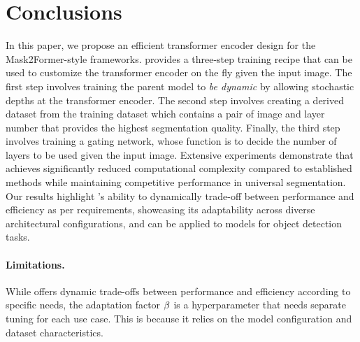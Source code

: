 \section{Conclusions}
In this paper, we propose an efficient transformer encoder design {\ours} for the Mask2Former-style frameworks. \ours provides a three-step training recipe that can be used to customize the transformer encoder on the fly given the input image. The first step involves training the parent model to \textit{be dynamic} by allowing stochastic depths at the transformer encoder. The second step involves creating a derived dataset from the training dataset which contains a pair of image and layer number that provides the highest segmentation quality. Finally, the third step involves training a gating network, whose function is to decide the number of layers to be used given the input image. Extensive experiments demonstrate that {\ours} achieves significantly reduced computational complexity compared to established methods while maintaining competitive performance in universal segmentation. Our results highlight {\ours}'s ability to dynamically trade-off between performance and efficiency as per requirements, showcasing its adaptability across diverse architectural configurations, and can be applied to models for object detection tasks.
%
\paragraph{Limitations.} While {\ours} offers dynamic trade-offs between performance and efficiency according to specific needs, the adaptation factor $\beta$ is a  hyperparameter that needs separate tuning for each use case. This is because it relies on the model configuration and dataset characteristics. 